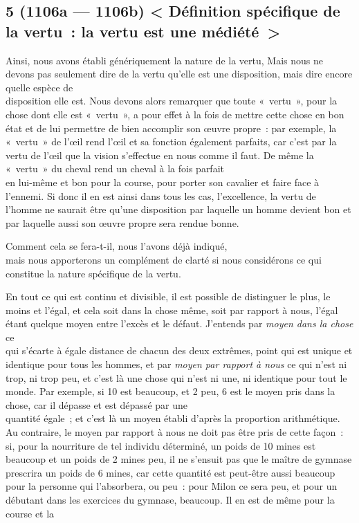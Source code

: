 \documentclass[french,twoside]{book} %
\begin{document}
\subsection[{5 (1106a — 1106b) < Définition spécifique de la vertu : la vertu est une médiété >}]{5 (1106a — 1106b) < Définition spécifique de la vertu : la vertu est une médiété >}
\noindent Ainsi, nous avons établi génériquement la nature de la vertu, Mais nous ne devons pas seulement dire de la vertu qu’elle est une disposition, mais dire encore quelle espèce de \\
disposition elle est. Nous devons alors remarquer que toute « vertu », pour la chose dont elle est « vertu », a pour effet à la fois de mettre cette chose en bon état et de lui permettre de bien accomplir son œuvre propre : par exemple, la « vertu » de l’œil rend l’œil et sa fonction également parfaits, car c’est par la vertu de l’œil que la vision s’effectue en nous comme il faut. De même la « vertu » du cheval rend un cheval à la fois parfait \\
en lui-même et bon pour la course, pour porter son cavalier et faire face à l’ennemi. Si donc il en est ainsi dans tous les cas, l’excellence, la vertu de l’homme ne saurait être qu’une disposition par laquelle un homme devient bon et par laquelle aussi son œuvre propre sera rendue bonne.\par
Comment cela se fera-t-il, nous l’avons déjà indiqué, \\
mais nous apporterons un complément de clarté si nous considérons ce qui constitue la nature spécifique de la vertu.\par
En tout ce qui est continu et divisible, il est possible de distinguer le plus, le moins et l’égal, et cela soit dans la chose même, soit par rapport à nous, l’égal étant quelque moyen entre l’excès et le défaut. J’entends par {\itshape moyen dans la chose} ce \\
qui s’écarte à égale distance de chacun des deux extrêmes, point qui est unique et identique pour tous les hommes, et par {\itshape moyen par rapport à nous} ce qui n’est ni trop, ni trop peu, et c’est là une chose qui n’est ni une, ni identique pour tout le monde. Par exemple, si 10 est beaucoup, et 2 peu, 6 est le moyen pris dans la chose, car il dépasse et est dépassé par une \\
quantité égale ; et c’est là un moyen établi d’après la proportion arithmétique. Au contraire, le moyen par rapport à nous ne doit pas être pris de cette façon : si, pour la nourriture de tel  individu déterminé, un poids de 10 mines est beaucoup et un poids de 2 mines peu, il ne s’ensuit pas que le maître de gymnase prescrira un poids de 6 mines, car cette quantité est peut-être aussi beaucoup pour la personne qui l’absorbera, ou peu : pour Milon ce sera peu, et pour un débutant dans les exercices du gymnase, beaucoup. Il en est de même pour la course et la \\
\end{document}
